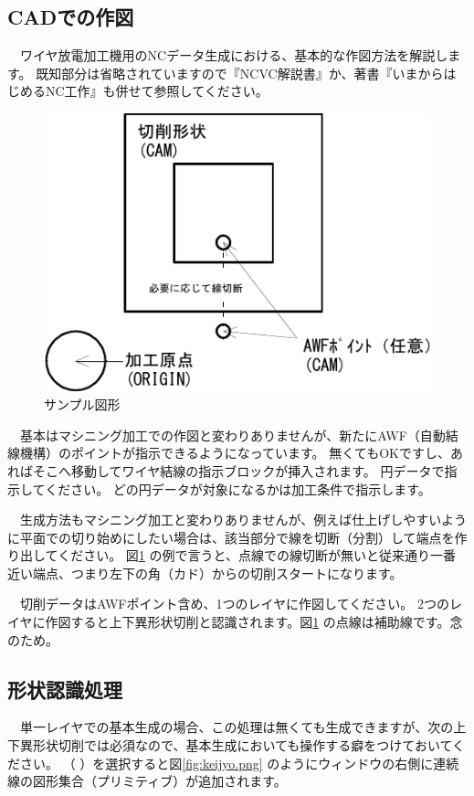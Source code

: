 

\subsection{CADでの作図}
　ワイヤ放電加工機用のNCデータ生成における、基本的な作図方法を解説します。
既知部分は省略されていますので『NCVC解説書』か、著書『いまからはじめるNC工作』も併せて参照してください。

\begin{figure}[H]
\centering
\includegraphics{No1/fig/sample1-crop.pdf}
\caption{サンプル図形}
\label{fig:sample1.pdf}
\end{figure}

　基本はマシニング加工での作図と変わりありませんが、新たにAWF（自動結線機構）のポイントが指示できるようになっています。
無くてもOKですし、あればそこへ移動してワイヤ結線の指示ブロックが挿入されます。
円データで指示してください。
どの円データが対象になるかは加工条件で指示します。

　生成方法もマシニング加工と変わりありませんが、例えば仕上げしやすいように平面での切り始めにしたい場合は、該当部分で線を切断（分割）して端点を作り出してください。
図\ref{fig:sample1.pdf} の例で言うと、点線での線切断が無いと従来通り一番近い端点、つまり左下の角（カド）からの切削スタートになります。

　切削データはAWFポイント含め、1つのレイヤに作図してください。
2つのレイヤに作図すると上下異形状切削と認識されます。図\ref{fig:sample1.pdf} の点線は補助線です。念のため。

\newpage %
\subsection{形状認識処理}
　単一レイヤでの基本生成の場合、この処理は無くても生成できますが、次の上下異形状切削では必須なので、基本生成においても操作する癖をつけておいてください。
（\,\,）を選択すると図\ref{fig:keijyo.png} のようにウィンドウの右側に連続線の図形集合（プリミティブ）が追加されます。


